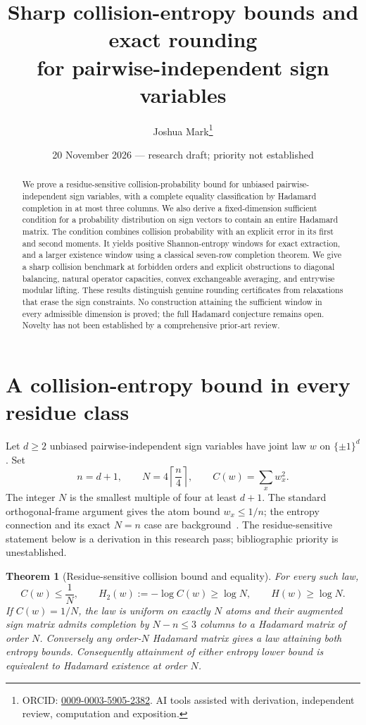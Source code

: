 \documentclass[11pt]{article}
\title{Sharp collision-entropy bounds and exact rounding\\for pairwise-independent sign variables}
\author{Joshua Mark\thanks{ORCID: \href{https://orcid.org/0009-0003-5905-2382}{0009-0003-5905-2382}. AI tools assisted with derivation, independent review, computation and exposition.}}
\date{20 November 2026 --- research draft; priority not established}
\newtheorem{theorem}{Theorem}[section]
\begin{document}
\maketitle
\begin{abstract}
We prove a residue-sensitive collision-probability bound for unbiased
pairwise-independent sign variables, with a complete equality
classification by Hadamard completion in at most three columns.
We also derive a fixed-dimension sufficient condition for a probability
distribution on sign vectors to contain an entire Hadamard matrix.
The condition combines collision probability with an explicit error
in its first and second moments. It yields positive Shannon-entropy
windows for exact extraction, and a larger existence window using
a classical seven-row completion theorem. We give a sharp collision
benchmark at forbidden orders and explicit obstructions to diagonal
balancing, natural operator capacities, convex exchangeable averaging,
and entrywise modular lifting. These results distinguish genuine
rounding certificates from relaxations that erase the sign constraints.
No construction attaining the sufficient window in every admissible
dimension is proved; the full Hadamard conjecture remains open.
Novelty has not been established by a comprehensive prior-art review.
\end{abstract}
\section{A collision-entropy bound in every residue class}
\label{sec:residue-bound}
Let $d\ge2$ unbiased pairwise-independent sign variables have joint
law $w$ on $\{\pm1\}^d$. Set
\[
 n=d+1,\qquad N=4\left\lceil\frac n4\right\rceil,
 \qquad C(w)=\sum_xw_x^2.
\]
The integer $N$ is the smallest multiple of four at least $d+1$.
The standard orthogonal-frame argument gives the atom bound
$w_x\le1/n$; the entropy connection and its exact $N=n$ case are
background~\cite{GP}. The residue-sensitive statement below is a
derivation in this research pass; bibliographic priority is unestablished.

\begin{theorem}[Residue-sensitive collision bound and equality]
\label{thm:residue-bound}
For every such law,
\[
 C(w)\le\frac1N,\qquad
 H_2(w):=-\log C(w)\ge\log N,\qquad H(w)\ge\log N.
\]
If $C(w)=1/N$, the law is uniform on exactly $N$ atoms and their
augmented sign matrix admits completion by $N-n\le3$ columns to a
Hadamard matrix of order $N$. Conversely any order-$N$ Hadamard matrix
gives a law attaining both entropy bounds. Consequently attainment
of either entropy lower bound is equivalent to Hadamard existence
at order $N$.
\end{theorem}
\end{document}
